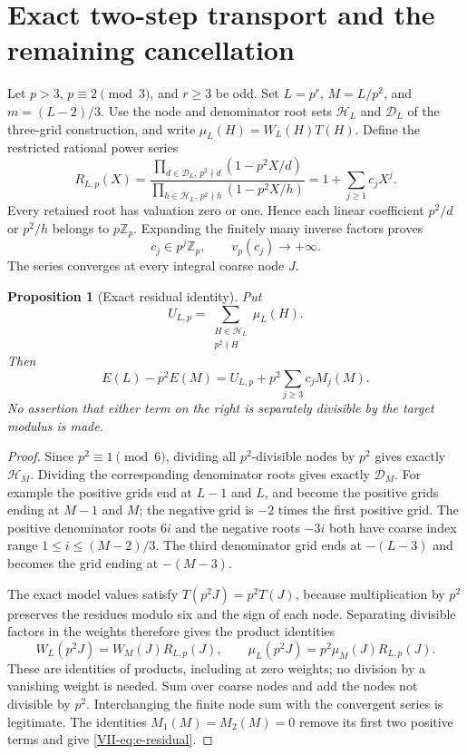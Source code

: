 \documentclass[11pt,letterpaper]{article}
\newtheorem{proposition}[theorem]{Proposition}
\numberwithin{equation}{section}
\begin{document}
\section{Exact two-step transport and the remaining cancellation}\label{loc-VII-15}
Let $p>3$, $p\equiv2\pmod3$, and $r\ge3$ be odd. Set
$L=p^r$, $M=L/p^2$, and $m=(L-2)/3$. Use the node and denominator
root sets $\mathcal H_L$ and $\mathcal D_L$ of the three-grid
construction, and write $\mu_L(H)=W_L(H)T(H)$.
Define the restricted rational power series
\[
 R_{L,p}(X)=
 \frac{\prod_{d\in\mathcal D_L,\,p^2\nmid d}(1-p^2X/d)}
 {\prod_{h\in\mathcal H_L,\,p^2\nmid h}(1-p^2X/h)}
 =1+\sum_{j\ge1}c_jX^j.
\]
Every retained root has valuation zero or one. Hence each linear
coefficient $p^2/d$ or $p^2/h$ belongs to $p\mathbb Z_p$.
Expanding the finitely many inverse factors proves
\[
 c_j\in p^j\mathbb Z_p,\qquad v_p(c_j)\longrightarrow+\infty.
\]
The series converges at every integral coarse node $J$.

\begin{proposition}[Exact residual identity]\label{VII-prop:e-residual}
Put
\[
 U_{L,p}=\sum_{\substack{H\in\mathcal H_L\\p^2\nmid H}}\mu_L(H).
\]
Then
\begin{equation}\label{VII-eq:e-residual}
 \boxed{E(L)-p^2E(M)
 =U_{L,p}+p^2\sum_{j\ge3}c_j M_j(M).}
\end{equation}
No assertion that either term on the right is separately divisible
by the target modulus is made.
\end{proposition}
\begin{proof}
Since $p^2\equiv1\pmod6$, dividing all $p^2$-divisible nodes by
$p^2$ gives exactly $\mathcal H_M$. Dividing the corresponding
denominator roots gives exactly $\mathcal D_M$. For example the
positive grids end at $L-1$ and $L$, and become the positive grids
ending at $M-1$ and $M$; the negative grid is $-2$ times the first
positive grid. The positive denominator roots $6i$ and the negative
roots $-3i$ both have coarse index range
$1\le i\le(M-2)/3$. The third denominator grid ends at $-(L-3)$
and becomes the grid ending at $-(M-3)$.

The exact model values satisfy $T(p^2J)=p^2T(J)$, because
multiplication by $p^2$ preserves the residues modulo six and the
sign of each node. Separating divisible factors in the weights
therefore gives the product identities
\[
 W_L(p^2J)=W_M(J)R_{L,p}(J),\qquad
 \mu_L(p^2J)=p^2\mu_M(J)R_{L,p}(J).
\]
These are identities of products, including at zero weights;
no division by a vanishing weight is needed. Sum over coarse nodes
and add the nodes not divisible by $p^2$. Interchanging the finite
node sum with the convergent series is legitimate. The identities
$M_1(M)=M_2(M)=0$ remove its first two positive terms and give
\eqref{VII-eq:e-residual}.
\end{proof}
\end{document}
